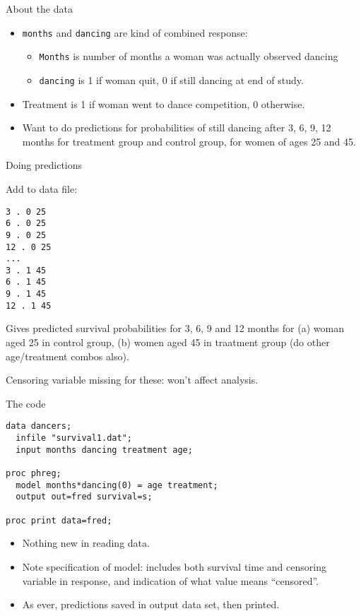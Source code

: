 \documentclass[pdf]{prosper}
\begin{document}
\begin{slide}{About the data}

  \begin{itemize}
  \item \verb-months- and \verb-dancing- are kind of combined response:
    \begin{itemize}
    \item  \verb-Months- is number of months a woman was actually observed dancing
    \item \verb-dancing- is 1 if woman quit, 0 if still dancing at end of study.
    \end{itemize}
  \item Treatment is 1 if woman went to dance competition, 0 otherwise.
  \item Want to do predictions for probabilities of still dancing after 3, 6, 9, 12 months for treatment group and control group, for women of ages 25 and 45.
\end{itemize}
\end{slide}

\begin{slide}{Doing predictions}

Add to data file:
{\scriptsize
\begin{verbatim}
3 . 0 25
6 . 0 25
9 . 0 25
12 . 0 25
...
3 . 1 45
6 . 1 45
9 . 1 45
12 . 1 45
\end{verbatim}
} 


\vspace{3ex}

Gives predicted survival probabilities for 3, 6, 9 and 12 months for
(a) woman aged 25 in control group, (b) women aged 45 in traatment
group (do other age/treatment combos also).

\vspace{2ex}

Censoring variable missing for these: won't affect analysis.

\end{slide}

\begin{slide}{The code}

\begin{verbatim}
data dancers;
  infile "survival1.dat";
  input months dancing treatment age;

proc phreg;
  model months*dancing(0) = age treatment;
  output out=fred survival=s;

proc print data=fred;
\end{verbatim}

\vspace{3ex}

  \begin{itemize}
  \item 
Nothing new in reading data.
\item Note specification of model: includes both survival time and censoring variable in response, and indication of what value means ``censored''.
\item As ever, predictions saved in output data set, then printed.
  \end{itemize}
  
\end{slide}
\end{document}
